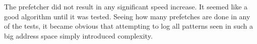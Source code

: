 The prefetcher did not result in any significant speed increase. It seemed like a good algorithm until it was tested. Seeing how many prefetches are done in any of the tests, it became obvious that attempting to log all patterns seen in such a big address space simply introduced complexity.

